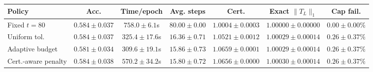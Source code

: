\begin{center}
\small
\setlength{\tabcolsep}{3pt}
\begin{tabular}{lcccccc}
\toprule
Policy & Acc. & Time/epoch & Avg. steps & Cert. & Exact $\|T_L\|_1$ & Cap fail. \\
\midrule
Fixed \(t=80\) & $0.584\pm0.037$ & $758.0\pm6.1$s & $80.00\pm0.00$ & $1.0004\pm0.0003$ & $1.00000\pm0.00000$ & $0.00\pm0.00\%$ \\
Uniform tol. & $0.584\pm0.037$ & $325.4\pm17.6$s & $16.36\pm0.71$ & $1.0521\pm0.0012$ & $1.00029\pm0.00014$ & $0.26\pm0.37\%$ \\
Adaptive budget & $0.581\pm0.034$ & $309.6\pm19.1$s & $15.86\pm0.73$ & $1.0659\pm0.0001$ & $1.00029\pm0.00014$ & $0.26\pm0.37\%$ \\
Cert.-aware penalty & $0.584\pm0.038$ & $570.2\pm34.2$s & $15.80\pm0.72$ & $1.0656\pm0.0000$ & $1.00030\pm0.00014$ & $0.26\pm0.37\%$ \\
\bottomrule
\end{tabular}
\label{tab:focused_controller_ablation}
\end{center}

